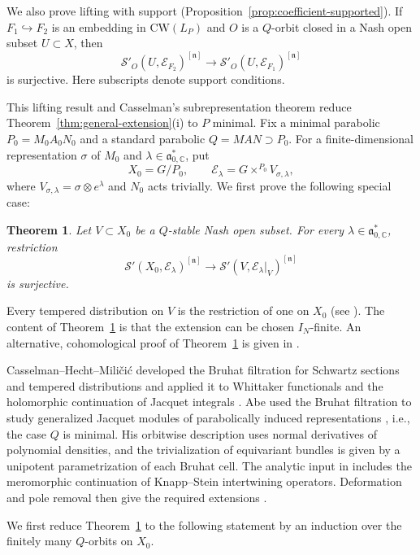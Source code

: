 \documentclass[a4paper,12pt]{amsart}
\numberwithin{equation}{section}
\newtheorem{maintheorem}{Theorem}
\theoremstyle{definition}
\theoremstyle{remark}
\newcommand{\C}{\mathbb C}
\newcommand{\fn}{\mathfrak n}
\newcommand{\fa}{\mathfrak a}
\newcommand{\IN}{I_N}
\newcommand{\mcS}{\mathcal S}
\newcommand{\mcE}{\mathcal E}
\begin{document}
We also prove lifting with support (Proposition~\ref{prop:coefficient-supported}). If $F_1\hookrightarrow F_2$ is an embedding in $\mathrm{CW}(L_P)$ and $O$ is a $Q$-orbit closed in a Nash open subset $U\subset X$, then
\[
 \mcS'_O(U,\mcE_{F_2})^{[\fn]}\longrightarrow
 \mcS'_O(U,\mcE_{F_1})^{[\fn]}
\]
is surjective. Here subscripts denote support conditions.

This lifting result and Casselman's subrepresentation theorem reduce Theorem~\ref{thm:general-extension}(i) to $P$ minimal. Fix a minimal parabolic $P_0=M_0A_0N_0$ and a standard parabolic $Q=MAN\supset P_0$. For a finite-dimensional representation $\sigma$ of $M_0$ and $\lambda\in\fa_{0,\C}^*$, put
\[
 X_0=G/P_0,\qquad \mcE_\lambda=G\times^{P_0}V_{\sigma,\lambda},
\]
where $V_{\sigma,\lambda}=\sigma\otimes e^\lambda$ and $N_0$ acts trivially. We first prove the following special case:

\begin{maintheorem}\label{thm:minimal-extension}
Let $V\subset X_0$ be a $Q$-stable Nash open subset. For every $\lambda\in\fa_{0,\C}^*$, restriction
\[
 \mcS'(X_0,\mcE_\lambda)^{[\fn]}\longrightarrow\mcS'(V,\mcE_\lambda|_V)^{[\fn]}
\]
is surjective.
\end{maintheorem}

Every tempered distribution on $V$ is the restriction of one on $X_0$ (see \cite[Theorem~5.4.1]{AG08}). The content of Theorem~\ref{thm:minimal-extension} is that the extension can be chosen $\IN$-finite.
An alternative, cohomological proof of
Theorem~\ref{thm:minimal-extension}
is given in \cite{XY26}.

Casselman--Hecht--Mili\v{c}i\'{c} developed the Bruhat filtration for Schwartz sections and tempered distributions and applied it to Whittaker functionals and the holomorphic continuation of Jacquet integrals \cite{CHM00}. Abe used the Bruhat filtration to study generalized Jacquet modules of parabolically induced representations \cite{Abe12}, i.e., the case $Q$ is minimal. His orbitwise description uses normal derivatives of polynomial densities, and the trivialization of equivariant bundles is given by a unipotent parametrization of each Bruhat cell. The analytic input in \cite[Proposition~4.4]{Abe12} includes the meromorphic continuation of Knapp--Stein intertwining operators. Deformation and pole removal then give the required extensions \cite[Lemmas~4.5--4.6]{Abe12}.

We first reduce Theorem~\ref{thm:minimal-extension} to the following statement by an induction over the finitely many $Q$-orbits on $X_0$.
\end{document}

